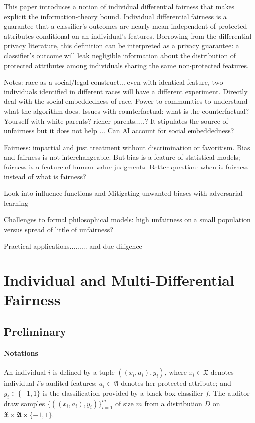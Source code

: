 \documentclass{article}
\begin{document}
\bigskip
This paper introduces a notion of individual differential fairness that makes explicit the information-theory bound. Individual differential fairness is a guarantee that a classifier's outcomes are nearly mean-independent of protected attributes conditional on an individual's features. Borrowing from the differential privacy literature, this definition can be interpreted as a privacy guarantee: a classifier's outcome will leak negligible information about the distribution of protected attributes among individuals sharing the same non-protected features. 


Notes: race as a social/legal construct... even with identical feature, two individuals identified in different races will have a different experiment. Directly deal with the social embeddedness of race. Power to communities to understand what the algorithm does. Issues with counterfactual: what is the counterfactual? Yourself with white parents? richer parents.....? It stipulates the source of unfairness but it does not help ... Can AI account for social embeddedness?

Fairness: impartial and just treatment without discrimination or favoritism. Bias and fairness is not interchangeable. But bias is a feature of statistical models; fairness is a feature of human value judgments. Better question: when is fairness instead of what is fairness? 

Look into influence functions and Mitigating unwanted biases with adversarial learning

Challenges to formal philosophical models: high unfairness on a small population versus spread of little of unfairness?

Practical applications......... and due diligence


\section{Individual and Multi-Differential Fairness}

\subsection{Preliminary}

\paragraph{Notations}
An individual $i$ is defined by a tuple $((x_{i}, a_{i}), y_{i})$, where $x_{i}\in \mathfrak{X}$ denotes individual $i$'s audited features; $a_{i}\in\mathfrak{A}$ denotes her protected attribute; and $y_{i}\in \{-1, 1\}$ is the classification provided by a black box classifier $f$. The auditor draw samples $
\{((x_{i}, a_{i}), y_{i})\}_{i=1}^{m}$ of size $m$ from a distribution $D$ on $\mathfrak{X} \times \mathfrak{A}\times \{-1, 1\}$. 
\end{document}
